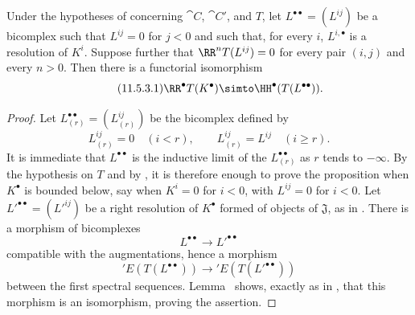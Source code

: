 \begin{proposition}[11.5.3]
\label{0.11.5.3}
Under the hypotheses of  concerning $\cat{C}$, $\cat{C}'$, and $T$, let $L^{\bullet\bullet}=(L^{ij})$ be a bicomplex such that $L^{ij}=0$ for $j<0$ and such that, for every $i$, $L^{i,\bullet}$ is a resolution of $K^i$.
Suppose further that $\RR^nT(L^{ij})=0$ for every pair $(i,j)$ and every $n>0$.
Then there is a functorial isomorphism
\[
\label{0.11.5.3.1}
\tag{11.5.3.1}
  \RR^\bullet T(K^\bullet)
  \simto
  \HH^\bullet(T(L^{\bullet\bullet})).
\]
\end{proposition}

\begin{proof}
Let $L^{\bullet\bullet}_{(r)}=(L^{ij}_{(r)})$ be the bicomplex defined by
\[
  L^{ij}_{(r)}=0\quad(i<r),\qquad
  L^{ij}_{(r)}=L^{ij}\quad(i\geq r).
\]
It is immediate that $L^{\bullet\bullet}$ is the inductive limit of the $L^{\bullet\bullet}_{(r)}$ as $r$ tends to $-\infty$.
By the hypothesis on $T$ and by , it is therefore enough to prove the proposition when $K^\bullet$ is bounded below, say when $K^i=0$ for $i<0$, with $L^{ij}=0$ for $i<0$.
Let $L'^{\bullet\bullet}=(L'^{ij})$ be a right resolution of $K^\bullet$ formed of objects of $\mathfrak{J}$, as in .
There is a morphism of bicomplexes
\[
  L^{\bullet\bullet}\longrightarrow L'^{\bullet\bullet}
\]
compatible with the augmentations, hence a morphism
\[
  'E(T(L^{\bullet\bullet}))\longrightarrow{}'E(T(L'^{\bullet\bullet}))
\]
between the first spectral sequences.
Lemma~ shows, exactly as in , that this morphism is an isomorphism, proving the assertion.
\end{proof}

